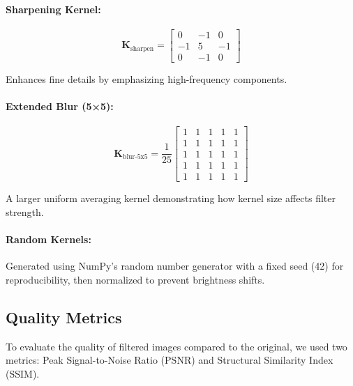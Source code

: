 \documentclass[12pt,a4paper]{article}
\newcommand{\kernel}[1]{\mathbf{K}_{\text{#1}}}
\begin{document}
	\paragraph{Sharpening Kernel:}
	\begin{equation}
		\kernel{sharpen} = \begin{bmatrix} 
			0 & -1 & 0 \\
			-1 & 5 & -1 \\
			0 & -1 & 0
		\end{bmatrix}
	\end{equation}
	
	Enhances fine details by emphasizing high-frequency components.
	
	\paragraph{Extended Blur (5×5):}
	\begin{equation}
		\kernel {blur-5x5} = \frac{1}{25} \begin{bmatrix} 
			1 & 1 & 1 & 1 & 1 \\
			1 & 1 & 1 & 1 & 1 \\
			1 & 1 & 1 & 1 & 1 \\
			1 & 1 & 1 & 1 & 1 \\
			1 & 1 & 1 & 1 & 1
		\end{bmatrix}
	\end{equation}
	
	A larger uniform averaging kernel demonstrating how kernel size affects filter strength.
	
	\paragraph{Random Kernels:} Generated using NumPy's random number generator with a fixed seed (42) for reproducibility, then normalized to prevent brightness shifts.
	
	\subsection{Quality Metrics}
	To evaluate the quality of filtered images compared to the original, we used two metrics: Peak Signal-to-Noise Ratio (PSNR) and Structural Similarity Index (SSIM).
	
\end{document}
